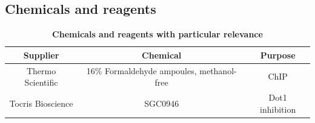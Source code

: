 \documentclass[11pt,twoside,a4paper]{report}
\begin{document}
		\subsection{Chemicals and reagents}
		
			\begin{table}[H]
       		\caption{\bf{Chemicals and reagents with particular relevance}}
        		\begin{center}
            		\begin{tabular}{c|c|c}
	               		Supplier & Chemical & Purpose\\
    		            \hline
    		            Thermo Scientific & 16\% Formaldehyde ampoules, methanol-free & ChIP\\
    		            Tocris Bioscience & SGC0946 & Dot1 inhibition\\
	            	\end{tabular}
    		    \end{center}
		    \end{table}
    
\end{document}
